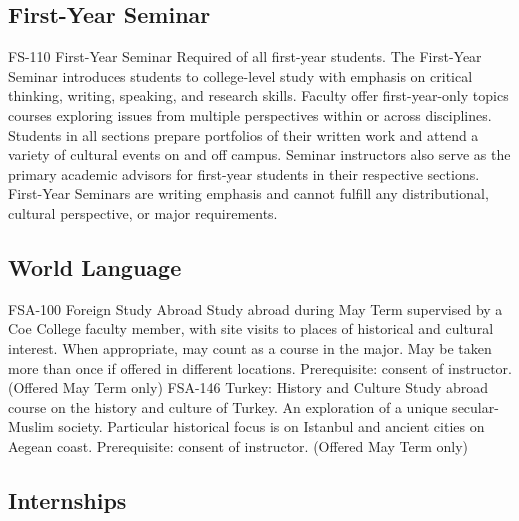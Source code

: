 \documentclass[
  letterpaper,
]{scrbook}
\begin{document}
\subsection{First-Year Seminar}\label{first-year-seminar}

FS-110 First-Year Seminar Required of all first-year students. The
First-Year Seminar introduces students to college-level study with
emphasis on critical thinking, writing, speaking, and research skills.
Faculty offer first-year-only topics courses exploring issues from
multiple perspectives within or across disciplines. Students in all
sections prepare portfolios of their written work and attend a variety
of cultural events on and off campus. Seminar instructors also serve as
the primary academic advisors for first-year students in their
respective sections. First-Year Seminars are writing emphasis and cannot
fulfill any distributional, cultural perspective, or major requirements.

\subsection{World Language}\label{world-language}

FSA-100 Foreign Study Abroad Study abroad during May Term supervised by
a Coe College faculty member, with site visits to places of historical
and cultural interest. When appropriate, may count as a course in the
major. May be taken more than once if offered in different locations.
Prerequisite: consent of instructor. (Offered May Term only) FSA-146
Turkey: History and Culture Study abroad course on the history and
culture of Turkey. An exploration of a unique secular-Muslim society.
Particular historical focus is on Istanbul and ancient cities on Aegean
coast. Prerequisite: consent of instructor. (Offered May Term only)

\subsection{Internships}\label{internships}
\end{document}
